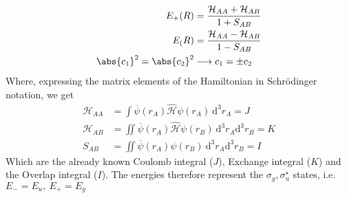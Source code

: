\documentclass[a4paper, 11pt]{book}
\newcommand{\1}{\opr{\mathds{1}}}
\newcommand{\diff}[2][]{\ \mathrm{d}^{#1}#2}
\newcommand{\ddiff}[3][]{\ \mathrm{d}^{#1}#2\mathrm{d}^{#1}#3}
\newcommand{\ham}{\mathcal{H}}
\newcommand{\opr}[1]{\hat{#1}}
\newcommand{\cc}[1]{\overline{#1}}
\theoremstyle{plain}
\begin{document}
	\begin{equation}
		\begin{aligned}
			E_+(R)&=\frac{\mathcal{H}_{AA}+\mathcal{H}_{AB}}{1+S_{AB}}\\
			E_(R)&=\frac{\mathcal{H}_{AA}-\mathcal{H}_{AB}}{1-S_{AB}}\\
			\abs{c_1}^2=\abs{c_2}^2&\longrightarrow c_1=\pm c_2
		\end{aligned}
		\label{eq:egeradeungeradevarlcao}
	\end{equation}
	Where, expressing the matrix elements of the Hamiltonian in Schrödinger notation, we get
	\begin{equation}
		\begin{aligned}
			\mathcal{H}_{AA}&=\int\cc{\psi}(r_A)\opr{\ham}\psi(r_A)\diff[3]{r_A}=J\\
			\mathcal{H}_{AB}&=\iint\cc{\psi}(r_A)\opr{\ham}\psi(r_B)\ddiff[3]{r_A}{r_B}=K\\
			S_{AB}&=\iint\cc{\psi}(r_A)\psi(r_B)\ddiff[3]{r_A}{r_B}=I
		\end{aligned}
		\label{eq:integralsmatrixelementsvarlcao}
	\end{equation}
	Which are the already known Coulomb integral ($J$), Exchange integral ($K$) and the Overlap integral ($I$). The energies therefore represent the $\sigma_g,\sigma_u^{\star}$ states, i.e. $E_-=E_u,\ E_+=E_g$
\end{document}
